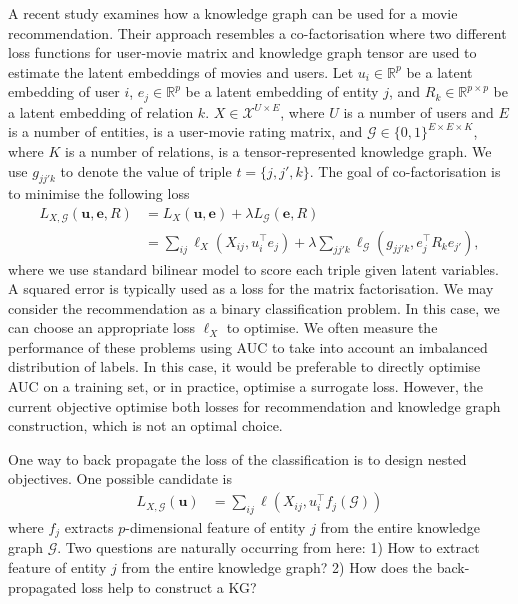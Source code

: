 \documentclass{article} %
\theoremstyle{definition}
\begin{document}
A recent study \cite{Zhang2016} examines how a knowledge graph can be used for a movie recommendation. Their approach resembles a co-factorisation where two different loss functions for user-movie matrix and knowledge graph tensor are used to estimate the latent embeddings of movies and users.
Let $u_i \in \mathbb{R}^p$ be a latent embedding of user $i$, $e_j \in \mathbb{R}^p$ be a latent embedding of entity $j$, and $R_k \in \mathbb{R}^{p\times p}$ be a latent embedding of relation $k$. $X \in \mathcal{X}^{U \times E}$, where $U$ is a number of users and $E$ is a number of entities, is a user-movie rating matrix, and $\mathcal{G} \in \{0,1\}^{E\times E \times K}$, where $K$ is a number of relations, is a tensor-represented knowledge graph. We use $g_{jj'k}$ to denote the value of triple $t=\{j, j', k\}$. The goal of co-factorisation is to minimise the following loss
\begin{align}
L_{X, \mathcal{G}}(\mathbf{u}, \mathbf{e}, R) & = L_X(\mathbf{u}, \mathbf{e}) + \lambda L_\mathcal{G}(\mathbf{e}, R)\\
& = \sum_{ij}\ell_X(X_{ij}, u_{i}^\top e_{j}) + \lambda \sum_{jj'k}\ell_\mathcal{G}(g_{jj'k}, e_j^\top R_k e_{j'}), \label{eqn:two_losses}
\end{align}
where we use standard bilinear model to score each triple given latent variables.
A squared error is typically used as a loss for the matrix factorisation. We may consider the recommendation as a binary classification problem. In this case, we can choose an appropriate loss $\ell_X$ to optimise.  We often measure the performance of these problems using AUC to take into account an imbalanced distribution of labels. In this case, it would be preferable to directly optimise AUC on a training set, or in practice, optimise a surrogate loss. However, the current objective optimise both losses for recommendation and knowledge graph construction, which is not an optimal choice.

One way to back propagate the loss of the classification is to design nested objectives. One possible candidate is
\begin{align}
\label{eqn:obj}
L_{X, \mathcal{G}}(\mathbf{u}) & = \sum_{ij}\ell(X_{ij}, u_{i}^\top f_j(\mathcal{G}))
\end{align}
where $f_j$ extracts $p$-dimensional feature of entity $j$ from the entire knowledge graph $\mathcal{G}$. Two questions are naturally occurring from here: 1) How to extract feature of entity $j$ from the entire knowledge graph? 2) How does the back-propagated loss help to construct a KG?
\end{document}
